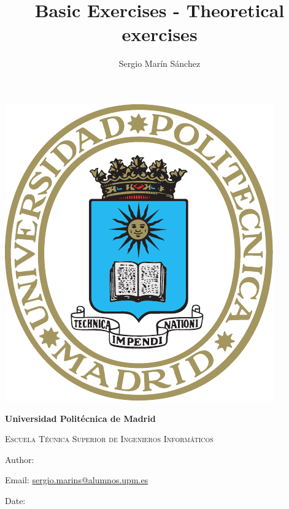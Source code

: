 \documentclass[12pt]{article}
\title{ Basic Exercises - Theoretical exercises %
}
\author{ Sergio Marín Sánchez %
}
\begin{document}
\begin{titlepage}
    \centering
    \phantom{a}
    \vspace{2cm}
    {\includegraphics[scale=0.9]{ESCUDO_UPM.pdf}\par}
    \vspace{2cm}
    {\bfseries\LARGE Universidad Politécnica de Madrid \par}
    \vspace{1cm}
    {\scshape\Large Escuela Técnica Superior de Ingenieros Informáticos \par}
    \vspace{1cm}
    {\scshape\Huge \thetitle \par}
    \vfill
    {\large Author: \theauthor \par}
    {\large Email: \href{mailto:sergio.marins@alumnos.upm.es}{sergio.marins@alumnos.upm.es} \par } %
    \vspace{0.2cm}
    {\large Date:  \par}
\end{titlepage}

\setcounter{page}{1}

\rhead{}
\lhead{}
\rfoot{}
\lfoot{}






\end{document}
